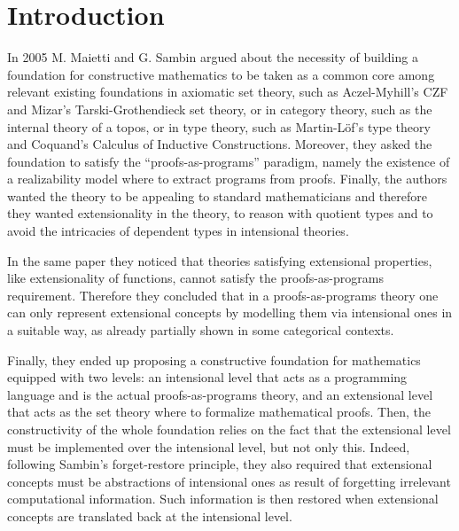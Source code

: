 
%

\section*{Introduction}

In 2005 M. Maietti and G. Sambin \cite{maietti2005toward} argued about the necessity of building a foundation for constructive mathematics to be taken as a common core among relevant existing foundations in axiomatic set theory, such as Aczel-Myhill's CZF and Mizar's Tarski-Grothendieck set theory, or in category theory, such as the internal theory of a topos, or in type theory, such as Martin-L\"of's type theory and Coquand's Calculus of Inductive Constructions. 
Moreover, they asked the foundation to satisfy the ``proofs-as-programs'' paradigm, namely the existence of a realizability model where to extract programs from proofs. 
Finally, the authors wanted the theory to be appealing to standard mathematicians and therefore they wanted extensionality in the theory, \eg to reason with quotient types and to avoid the intricacies of dependent types in intensional theories.

In the same paper they noticed that theories satisfying extensional properties, like extensionality of functions, cannot satisfy the proofs-as-programs requirement.
Therefore they concluded that in a proofs-as-programs theory one can only represent extensional concepts by modelling them via intensional ones in a suitable way, as already partially shown in some categorical contexts.

Finally, they ended up proposing a constructive foundation for mathematics equipped with two levels: an intensional level that acts as a programming language and is the actual proofs-as-programs theory, and an extensional level that acts as the set theory where to formalize mathematical proofs. Then, the constructivity of the whole foundation relies on the fact that the extensional level must be implemented over the intensional level, but not only this. Indeed, following Sambin's forget-restore principle, they also required that extensional concepts must be abstractions of intensional ones as result of forgetting irrelevant computational information.
Such information is then restored when extensional concepts are translated back at the intensional level.


